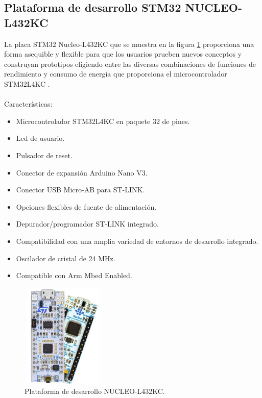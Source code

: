 \subsection{Plataforma de desarrollo STM32 NUCLEO-L432KC}
La placa STM32 Nucleo-L432KC que se muestra en la figura \ref{fig:nucleol432kc} proporciona una forma asequible y flexible para que los usuarios prueben nuevos conceptos y construyan prototipos eligiendo entre las diversas combinaciones de funciones de rendimiento y consumo de energía que proporciona el microcontrolador STM32L4KC \citep{NUCLEOL432KC}.
\\ 
\\ Características:
\begin{itemize}
	\item Microcontrolador STM32L4KC en paquete 32 de pines.
	\item Led de usuario.
	\item Pulsador de reset.
	\item Conector de expansión Arduino Nano V3.
	\item Conector USB Micro-AB para ST-LINK.
	\item Opciones flexibles de fuente de alimentación.
	\item Depurador/programador ST-LINK integrado.
	\item Compatibilidad con una amplia variedad de entornos de desarrollo integrado.
	\item Oscilador de cristal de 24 MHz.
	\item Compatible con Arm Mbed Enabled.   
\end{itemize}
\begin{figure}[htbp]
	\centering
	\includegraphics[width=4cm, height=5cm]{./Figures/nucleo-l432kc.png}
	\caption{Plataforma de desarrollo NUCLEO-L432KC\protect\footnotemark.}
	\label{fig:nucleol432kc}
\end{figure}
\vspace{5cm}
